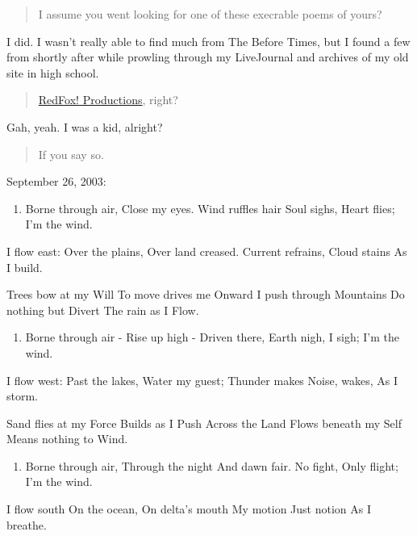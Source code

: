 \begin{quote}
I assume you went looking for one of these execrable poems of yours?
\end{quote}

I did. I wasn't really able to find much from The Before Times, but I found a few from shortly after while prowling through my LiveJournal and archives of my old site in high school.

\begin{quote}
\href{https://web.archive.org/web/2005*/http://ranna.babylonia.flatirons.org/}{RedFox! Productions}, right?
\end{quote}

Gah, yeah. I was a kid, alright?

\begin{quote}
If you say so.
\end{quote}

September 26, 2003:

\begin{enumerate}
\def\labelenumi{\Roman{enumi}.}
\tightlist
\item
  Borne through air, Close my eyes. Wind ruffles hair Soul sighs, Heart flies; I'm the wind.
\end{enumerate}

I flow east: Over the plains, Over land creased. Current refrains, Cloud stains As I build.

Trees bow at my Will To move drives me Onward I push through Mountains Do nothing but Divert The rain as I Flow.

\begin{enumerate}
\def\labelenumi{\Roman{enumi}.}
\setcounter{enumi}{1}
\tightlist
\item
  Borne through air - Rise up high - Driven there, Earth nigh, I sigh; I'm the wind.
\end{enumerate}

I flow west: Past the lakes, Water my guest; Thunder makes Noise, wakes, As I storm.

Sand flies at my Force Builds as I Push Across the Land Flows beneath my Self Means nothing to Wind.

\begin{enumerate}
\def\labelenumi{\Roman{enumi}.}
\setcounter{enumi}{2}
\tightlist
\item
  Borne through air, Through the night And dawn fair. No fight, Only flight; I'm the wind.
\end{enumerate}

I flow south On the ocean, On delta's mouth My motion Just notion As I breathe.

